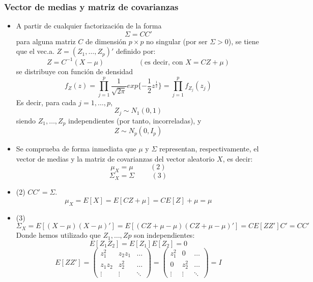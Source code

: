 \documentclass[11pt,a4paper]{article}
\begin{document}
\subsubsection{Vector de medias y matriz de covarianzas}
\begin{itemize}
\item A partir de cualquier factorización de la forma
$$\Sigma = CC'$$
para alguna matriz $C$ de dimensión $p \times p$ no singular (por ser $\Sigma > 0$), se tiene que el vec.a. $Z = (Z_{1}, \dots, Z_{p})'$ definido por:
$$Z = C^{-1}(X - \mu) \hspace{2cm} (\text{es decir, con } X = CZ + \mu)$$
se distribuye con función de densidad
$$f_{Z}(z) = \prod_{j=1}^{p} \frac{1}{\sqrt{2\pi}} exp\{-\frac{1}{2} z^{\frac{1}{2}}\} = \prod_{j=1}^{p} f_{Z_{j}}(z_{j})$$
Es decir, para cada $j = 1, \dots, p$,
$$Z_{j} \sim N_{1}(0, 1)$$
siendo $Z_{1}, \dots, Z_{p}$ independientes (por tanto, incorreladas), y
$$Z \sim N_{p}(0, I_{p})$$

\item Se comprueba de forma inmediata que $\mu$ y $\Sigma$ representan, respectivamente, el vector de medias y la matriz de covarianzas del vector aleatorio $X$, es decir:
$$ \mu_{X} = \mu \hspace{1cm} (2)$$
$$ \Sigma_{X} = \Sigma \hspace{1cm} (3)$$

\item (2) $CC' = \Sigma$.
$$\mu_{X} = E[X] = E[CZ + \mu] = CE[Z] + \mu = \mu$$
\item (3) $$\Sigma_{X} = E[(X-\mu)(X-\mu)'] = E[(CZ+\mu-\mu)(CZ+\mu-\mu)'] = CE[ZZ']C' = CC'$$
Donde hemos utilizado que $Z_{1}, \dots, Z{p}$ son independientes:
$$E[Z_{1}Z_{2}] = E[Z_{1}]E[Z_{2}] = 0$$
$$E[ZZ'] = \begin{pmatrix}
z_{1}^{2} & z_{2}z_{1} & \dots \\
z_{1}z_{2} & z_{2}^{2} & \dots \\
\vdots & \vdots & \ddots
\end{pmatrix} = \begin{pmatrix}
z_{1}^{2} & 0 & \dots \\
0 & z_{2}^{2} & \dots \\
\vdots & \vdots & \ddots
\end{pmatrix} = I$$
\end{itemize}
\end{document}

